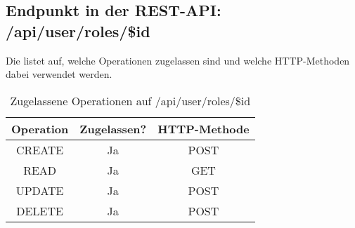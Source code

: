 \subsection{Endpunkt in der REST-API: /api/user/roles/\$id}
Die  listet auf, welche Operationen zugelassen sind und welche HTTP-Methoden dabei verwendet werden. 

\begin{table}[!htbp]
	\begin{tabular}{|c|c|c|}
		\hline
			\textbf{Operation} & \textbf{Zugelassen?} & \textbf{HTTP-Methode} \\ \hline
			CREATE & Ja & POST \\ \hline 
			READ & Ja & GET \\ \hline
			UPDATE & Ja & POST \\ \hline 
			DELETE & Ja & POST \\ \hline
	\end{tabular}

		\caption{Zugelassene Operationen auf /api/user/roles/\$id}
		\label{tab:end:rest:api:user:roles:id:meth}
\end{table}
